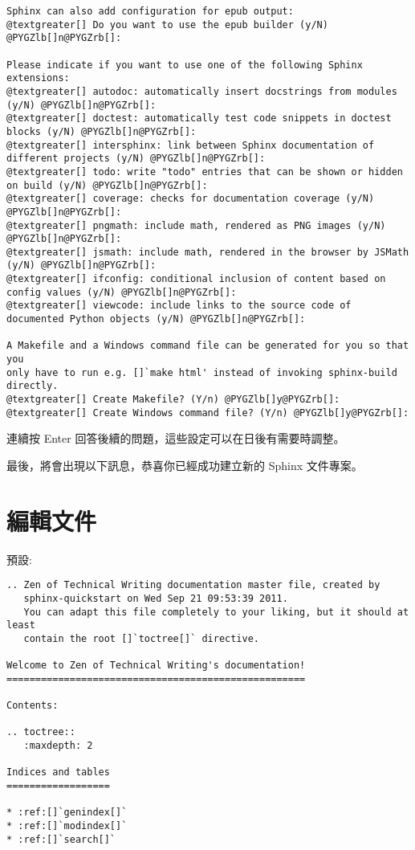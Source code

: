\documentclass[a4paper,12pt,english]{sphinxmanual}
\begin{document}
\begin{Verbatim}[commandchars=@\[\]]
Sphinx can also add configuration for epub output:
@textgreater[] Do you want to use the epub builder (y/N) @PYGZlb[]n@PYGZrb[]:

Please indicate if you want to use one of the following Sphinx extensions:
@textgreater[] autodoc: automatically insert docstrings from modules (y/N) @PYGZlb[]n@PYGZrb[]:
@textgreater[] doctest: automatically test code snippets in doctest blocks (y/N) @PYGZlb[]n@PYGZrb[]:
@textgreater[] intersphinx: link between Sphinx documentation of different projects (y/N) @PYGZlb[]n@PYGZrb[]:
@textgreater[] todo: write "todo" entries that can be shown or hidden on build (y/N) @PYGZlb[]n@PYGZrb[]:
@textgreater[] coverage: checks for documentation coverage (y/N) @PYGZlb[]n@PYGZrb[]:
@textgreater[] pngmath: include math, rendered as PNG images (y/N) @PYGZlb[]n@PYGZrb[]:
@textgreater[] jsmath: include math, rendered in the browser by JSMath (y/N) @PYGZlb[]n@PYGZrb[]:
@textgreater[] ifconfig: conditional inclusion of content based on config values (y/N) @PYGZlb[]n@PYGZrb[]:
@textgreater[] viewcode: include links to the source code of documented Python objects (y/N) @PYGZlb[]n@PYGZrb[]:

A Makefile and a Windows command file can be generated for you so that you
only have to run e.g. []`make html' instead of invoking sphinx-build
directly.
@textgreater[] Create Makefile? (Y/n) @PYGZlb[]y@PYGZrb[]:
@textgreater[] Create Windows command file? (Y/n) @PYGZlb[]y@PYGZrb[]:
\end{Verbatim}

連續按 Enter 回答後續的問題，這些設定可以在日後有需要時調整。

最後，將會出現以下訊息，恭喜你已經成功建立新的 Sphinx 文件專案。


\section{編輯文件}
\label{sphinx_firstlook::doc}\label{sphinx_firstlook:id1}
預設:

\begin{Verbatim}[commandchars=@\[\]]
.. Zen of Technical Writing documentation master file, created by
   sphinx-quickstart on Wed Sep 21 09:53:39 2011.
   You can adapt this file completely to your liking, but it should at least
   contain the root []`toctree[]` directive.

Welcome to Zen of Technical Writing's documentation!
====================================================

Contents:

.. toctree::
   :maxdepth: 2

Indices and tables
==================

* :ref:[]`genindex[]`
* :ref:[]`modindex[]`
* :ref:[]`search[]`
\end{Verbatim}
\end{document}
